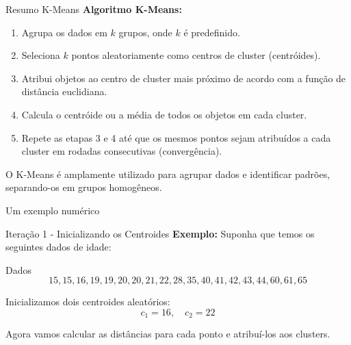 \documentclass{beamer}
\begin{document}
\begin{frame}{Resumo K-Means}
    \textbf{Algoritmo K-Means:}
    \begin{enumerate}
        \item Agrupa os dados em \(k\) grupos, onde \(k\) é predefinido.
        \item Seleciona \(k\) pontos aleatoriamente como centros de cluster (centróides).
        \item Atribui objetos ao centro de cluster mais próximo de acordo com a função de distância euclidiana.
        \item Calcula o centróide ou a média de todos os objetos em cada cluster.
        \item Repete as etapas 3 e 4 até que os mesmos pontos sejam atribuídos a cada cluster em rodadas consecutivas (convergência).
    \end{enumerate}
    \vspace{0.5cm}
    O K-Means é amplamente utilizado para agrupar dados e identificar padrões, separando-os em grupos homogêneos.
\end{frame}


\begin{frame}
    \centering
    \huge
    Um exemplo numérico
\end{frame}




\begin{frame}{Iteração 1 - Inicializando os Centroides}
    \textbf{Exemplo:} Suponha que temos os seguintes dados de idade:

    \begin{block}{Dados}
    \[
    15, 15, 16, 19, 19, 20, 20, 21, 22, 28, 35, 40, 41, 42, 43, 44, 60, 61, 65
    \]
    \end{block}

    Inicializamos dois centroides aleatórios:
    \[
    c_1 = 16, \quad c_2 = 22
    \]

    Agora vamos calcular as distâncias para cada ponto e atribuí-los aos clusters.
\end{frame}
\end{document}
